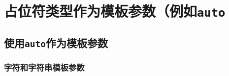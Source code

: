 \section{占位符类型作为模板参数（例如\texttt{auto}}\label{ch13}

\subsection{使用\texttt{auto}作为模板参数}\label{ch13.1}

\subsubsection{字符和字符串模板参数}\label{ch13.1.1}